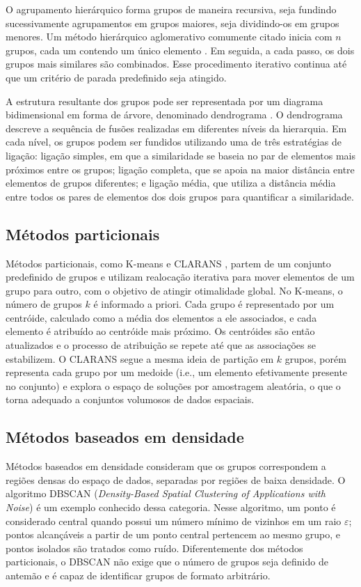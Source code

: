 O agrupamento hierárquico forma grupos de maneira recursiva, seja fundindo sucessivamente agrupamentos em grupos maiores, seja dividindo-os em grupos menores. Um método hierárquico aglomerativo comumente citado inicia com $n$ grupos, cada um contendo um único elemento \cite{johnson:etal:2002}. Em seguida, a cada passo, os dois grupos mais similares são combinados. Esse procedimento iterativo continua até que um critério de parada predefinido seja atingido.

A estrutura resultante dos grupos pode ser representada por um diagrama bidimensional em forma de árvore, denominado dendrograma \cite{sibbald:etal:1989}. O dendrograma descreve a sequência de fusões realizadas em diferentes níveis da hierarquia. Em cada nível, os grupos podem ser fundidos utilizando uma de três estratégias de ligação: ligação simples, em que a similaridade se baseia no par de elementos mais próximos entre os grupos; ligação completa, que se apoia na maior distância entre elementos de grupos diferentes; e ligação média, que utiliza a distância média entre todos os pares de elementos dos dois grupos para quantificar a similaridade.

\subsection{Métodos particionais}

Métodos particionais, como K-means \cite{hartigan:etal:1979} e CLARANS \cite{ng:etal:2002}, partem de um conjunto predefinido de grupos e utilizam realocação iterativa para mover elementos de um grupo para outro, com o objetivo de atingir otimalidade global. No K-means, o número de grupos $k$ é informado a priori. Cada grupo é representado por um centróide, calculado como a média dos elementos a ele associados, e cada elemento é atribuído ao centróide mais próximo. Os centróides são então atualizados e o processo de atribuição se repete até que as associações se estabilizem. O CLARANS segue a mesma ideia de partição em $k$ grupos, porém representa cada grupo por um medoide (i.e., um elemento efetivamente presente no conjunto) e explora o espaço de soluções por amostragem aleatória, o que o torna adequado a conjuntos volumosos de dados espaciais.

\subsection{Métodos baseados em densidade}

Métodos baseados em densidade consideram que os grupos correspondem a regiões densas do espaço de dados, separadas por regiões de baixa densidade. O algoritmo DBSCAN (\textit{Density-Based Spatial Clustering of Applications with Noise}) \cite{ester:etal:1996} é um exemplo conhecido dessa categoria. Nesse algoritmo, um ponto é considerado central quando possui um número mínimo de vizinhos em um raio $\varepsilon$; pontos alcançáveis a partir de um ponto central pertencem ao mesmo grupo, e pontos isolados são tratados como ruído. Diferentemente dos métodos particionais, o DBSCAN não exige que o número de grupos seja definido de antemão e é capaz de identificar grupos de formato arbitrário.

